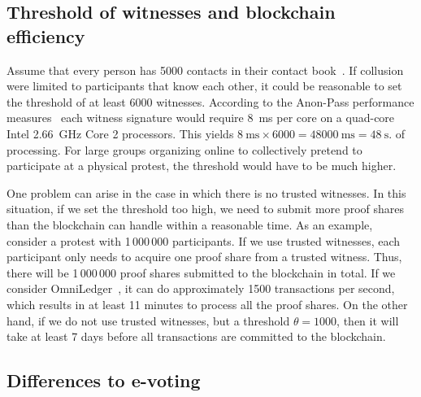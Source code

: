 \subsection{Threshold of witnesses and blockchain efficiency}

Assume that every person has 5000 contacts in their contact book~\cite{DifficultyOfPrivateContactDiscovery}.
If collusion were limited to participants that know each other, it could be reasonable to set the threshold of at least 6000 witnesses.
According to the Anon-Pass performance measures~\cite{AnonPass} each witness signature would require \SI{8}{\milli\second} per core on a quad-core Intel \SI{2.66}{\giga\hertz} Core 2 processors.
This yields \(
  \SI{8}{\milli\second}\times 6000 = \SI{48000}{\milli\second} = 
  \SI{48}{\second}.
\) of processing. For large groups organizing online to collectively pretend to participate at a physical protest, the threshold would have to be much higher.


One problem can arise in the case in which there is no trusted witnesses.
In this situation, if we set the threshold too high, we need to submit more proof shares than the blockchain can handle within a reasonable time.
As an example, consider a protest with 1\,000\,000 participants.
If we use trusted witnesses, each participant only needs to acquire one proof share from a trusted witness.
Thus, there will be 1\,000\,000 proof shares submitted to the blockchain in total.
If we consider OmniLedger~\cite{OmniLedger}, it can do approximately 1500 transactions per second, which results in at least 11 minutes to process all the proof shares.
On the other hand, if we do not use trusted witnesses, but a threshold \(\theta = 1000\), then it will take at least 7 days before all transactions are committed to the blockchain.


 
\subsection{Differences to e-voting}

